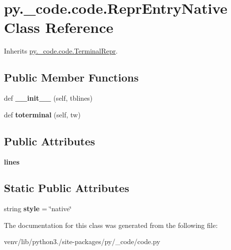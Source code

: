 \hypertarget{classpy_1_1__code_1_1code_1_1_repr_entry_native}{}\section{py.\+\_\+code.\+code.\+Repr\+Entry\+Native Class Reference}
\label{classpy_1_1__code_1_1code_1_1_repr_entry_native}


Inherits \hyperlink{classpy_1_1__code_1_1code_1_1_terminal_repr}{py.\+\_\+code.\+code.\+Terminal\+Repr}.

\subsection*{Public Member Functions}
\begin{DoxyCompactItemize}
\item 
\mbox{\label{classpy_1_1__code_1_1code_1_1_repr_entry_native_ac363659ed3a7a8291d12187ffaf1cc87}} 
def {\bfseries \+\_\+\+\_\+init\+\_\+\+\_\+} (self, tblines)
\item 
\mbox{\label{classpy_1_1__code_1_1code_1_1_repr_entry_native_abfafca6c55606cee5ca34b3b0cf7158a}} 
def {\bfseries toterminal} (self, tw)
\end{DoxyCompactItemize}
\subsection*{Public Attributes}
\begin{DoxyCompactItemize}
\item 
\mbox{\label{classpy_1_1__code_1_1code_1_1_repr_entry_native_af0d63e09fb9c87cd5e04fce908d51c0e}} 
{\bfseries lines}
\end{DoxyCompactItemize}
\subsection*{Static Public Attributes}
\begin{DoxyCompactItemize}
\item 
\mbox{\label{classpy_1_1__code_1_1code_1_1_repr_entry_native_a7fe7df9cdb266f7b9e4f5f6c3f196542}} 
string {\bfseries style} = \char`\"{}native\char`\"{}
\end{DoxyCompactItemize}


The documentation for this class was generated from the following file\+:\begin{DoxyCompactItemize}
\item 
venv/lib/python3./site-\/packages/py/\+\_\+code/code.\+py\end{DoxyCompactItemize}
